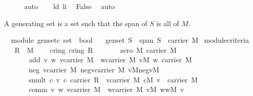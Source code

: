 \begin{isabellebody}
\ \ \ \ \isamarkupfalse%
\ auto\isanewline
\ \ \isamarkupfalse%
\ ld\ li\ \isamarkupfalse%
\ False\ \isamarkupfalse%
\ auto\isanewline
{}\isamarkupfalse%
%
\endisatagproof
{\isafoldproof}%
%
\isadelimproof
%
\endisadelimproof
%
\begin{isamarkuptext}%
A generating set is a set such that the span of $S$ is all of $M$.%
\end{isamarkuptext}%
\isamarkuptrue%
\isamarkupfalse%
\ {\isacharparenleft}\ module{\isacharparenright}\ gen{\isacharunderscore}set{\isacharcolon}{\isacharcolon}{\isachardoublequoteopen}{\isacharprime}c\ set\ {\isasymRightarrow}\ bool{\isachardoublequoteclose}\isanewline
\ \ \ {\isachardoublequoteopen}gen{\isacharunderscore}set\ S\ {\isasymequiv}\ {\isacharparenleft}span\ S\ {\isacharequal}\ carrier\ M{\isacharparenright}{\isachardoublequoteclose}%
\isamarkuptrue%
\isamarkupfalse%
\ module{\isacharunderscore}criteria{\isacharcolon}\isanewline
\ \ \ R\ \ M\ \isanewline
\ \ \ cring{\isacharcolon}\ {\isachardoublequoteopen}cring\ R{\isachardoublequoteclose}\isanewline
\ \ \ \ \ \ \ zero{\isacharcolon}\ {\isachardoublequoteopen}{\isasymzero}\isactrlbsub M\isactrlesub {\isasymin}\ carrier\ M{\isachardoublequoteclose}\ \isanewline
\ \ \ \ \ \ \ add{\isacharcolon}\ {\isachardoublequoteopen}{\isasymforall}v\ w{\isachardot}\ v{\isasymin}carrier\ M\ {\isasymand}\ w{\isasymin}carrier\ M{\isasymlongrightarrow}\ v{\isasymoplus}\isactrlbsub M\isactrlesub \ w{\isasymin}\ carrier\ M{\isachardoublequoteclose}\isanewline
\ \ \ \ \ \ \ neg{\isacharcolon}\ {\isachardoublequoteopen}{\isasymforall}v{\isasymin}carrier\ M{\isachardot}\ {\isacharparenleft}{\isasymexists}neg{\isacharunderscore}v{\isasymin}carrier\ M{\isachardot}\ v{\isasymoplus}\isactrlbsub M\isactrlesub neg{\isacharunderscore}v{\isacharequal}{\isasymzero}\isactrlbsub M\isactrlesub {\isacharparenright}{\isachardoublequoteclose}\isanewline
\ \ \ \ \ \ \ smult{\isacharcolon}\ {\isachardoublequoteopen}{\isasymforall}c\ v{\isachardot}\ c{\isasymin}\ carrier\ R\ {\isasymand}\ v{\isasymin}carrier\ M{\isasymlongrightarrow}\ c{\isasymodot}\isactrlbsub M\isactrlesub \ v\ {\isasymin}\ carrier\ M{\isachardoublequoteclose}\isanewline
\ \ \ \ \ \ \ comm{\isacharcolon}\ {\isachardoublequoteopen}{\isasymforall}v\ w{\isachardot}\ v{\isasymin}carrier\ M\ {\isasymand}\ w{\isasymin}carrier\ M{\isasymlongrightarrow}\ v{\isasymoplus}\isactrlbsub M\isactrlesub \ w{\isacharequal}w{\isasymoplus}\isactrlbsub M\isactrlesub \ v{\isachardoublequoteclose}\isanewline

\end{isabellebody}
